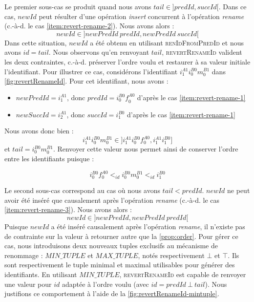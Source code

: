 \documentclass[12pt]{thesul}
\newcommand{\ie}{c.-à-d. }
\newcommand{\trm}[1]{\mathit{#1}}
\newcommand{\id}[3]{$\trm{#1}^{\trm{#2}}_{\trm{#3}}$}
\begin{document}
Le premier sous-cas se produit quand nous avons $\trm{tail} \in ]\trm{predId}, \trm{succId}[$.
Dans ce cas, $\trm{newId}$ peut résulter d'une opération \emph{insert} concurrent à l'opération \emph{rename} (\ie le cas \ref{item:revert-rename-2}).
Nous avons alors :
\[\trm{newId} \in ]\trm{newPredId~predId}, \trm{newPredId~succId}[\]
Dans cette situation, $\trm{newId}$ a été obtenu en utilisant \textsc{renIdFromPredId} et nous avons $\trm{id} = \trm{tail}$.
Nous observons qu'en renvoyant $\trm{tail}$, \textsc{revertRenameId} valident les deux contraintes, \ie préserver l'ordre voulu et restaurer à sa valeur initiale l'identifiant.
Pour illustrer ce cas, considérons l'identifiant \id{i}{A1}{1}\id{i}{B0}{0}\id{m}{B1}{0} dans \autoref{fig:revertRenameId}.
Pour cet identifiant, nous avons :
\begin{itemize}
  \item $newPredId = $\id{i}{A1}{1}, donc $predId = $\id{i}{B0}{0}\id{f}{A0}{0} d'après le cas \ref{item:revert-rename-1}
  \item $newSuccId = $\id{i}{A1}{2}, donc $succId = $\id{i}{B0}{1} d'après le cas \ref{item:revert-rename-1}
\end{itemize}
Nous avons donc bien :
\[i^{A1}_{1}i^{B0}_{0}m^{B1}_{0} \in ]i^{A1}_{1}i^{B0}_{0}f^{A0}_{0}, i^{A1}_{1}i^{B0}_{1}]\]
et $tail = $\id{i}{B0}{0}\id{m}{B1}{0}.
Renvoyer cette valeur nous permet ainsi de conserver l'ordre entre les identifiants puisque :

\[i^{B0}_{0}f^{A0}_{0} <_{id} i^{B0}_{0}m^{B1}_{0} <_{id} i^{B0}_{1}\]

Le second sous-cas correspond au cas où nous avons $\trm{tail} < \trm{predId}$.
$\trm{newId}$ ne peut avoir été inséré que causalement après l'opération \emph{rename} (\ie le cas \ref{item:revert-rename-3}).
Nous avons alors :
\[\trm{newId} \in ]\trm{newPredId}, \trm{newPredId~predId}[\]
Puisque $\trm{newId}$ a été inséré causalement après l'opération \emph{rename}, il n'existe pas de contrainte sur la valeur à retourner autre que la \autoref{prop:order}.
Pour gérer ce cas, nous introduisons deux nouveaux tuples exclusifs au mécanisme de renommage : $\trm{MIN\_TUPLE}$ et $\trm{MAX\_TUPLE}$, notés respectivement $\bot$ et $\top$.
Ils sont respectivement le tuple minimal et maximal utilisables pour générer des identifiants.
En utilisant $\trm{MIN\_TUPLE}$, \textsc{revertRenameId} est capable de renvoyer une valeur pour $\trm{id}$ adaptée à l'ordre voulu (avec $\trm{id} = \trm{predId~\bot~tail}$).
Nous justifions ce comportement à l'aide de la \autoref{fig:revertRenameId-mintuple}.
\end{document}
